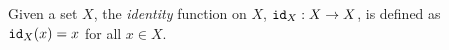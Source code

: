 \guard




\begin{defn}
\label{defn:identityFunction}
  Given a set $X$, the \emph{identity} function on $X$, $\texttt{id}_X:X\to X$, is defined as $\texttt{id}_X(x)=x$ for all $x\in X$.
\end{defn}
